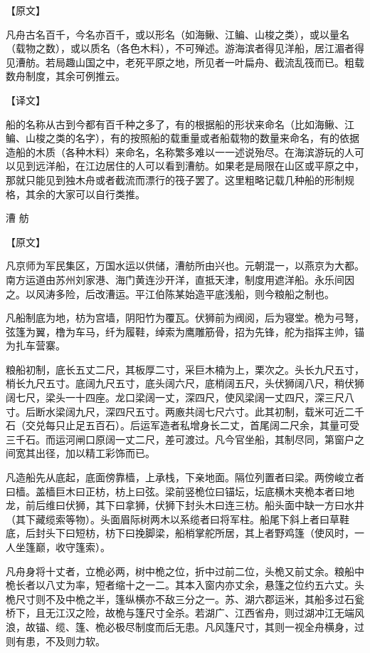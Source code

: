 \documentclass[12pt,UTF8]{ctexbook}
\begin{document}
【原文】

凡舟古名百千，今名亦百千，或以形名（如海鳅、江鳊、山梭之类），或以量名（载物之数），或以质名（各色木料），不可殚述。游海滨者得见洋船，居江湄者得见漕舫。若局趣山国之中，老死平原之地，所见者一叶扁舟、截流乱筏而已。粗载数舟制度，其余可例推云。

【译文】

船的名称从古到今都有百千种之多了，有的根据船的形状来命名（比如海鳅、江鳊、山梭之类的名字），有的按照船的载重量或者船载物的数量来命名，有的依据造船的木质（各种木料）来命名，名称繁多难以一一述说殆尽。在海滨游玩的人可以见到远洋船，在江边居住的人可以看到漕舫。如果老是局限在山区或平原之中，那就只能见到独木舟或者截流而漂行的筏子罢了。这里粗略记载几种船的形制规格，其余的大家可以自行类推。

漕 舫

【原文】

凡京师为军民集区，万国水运以供储，漕舫所由兴也。元朝混一，以燕京为大都。南方运道由苏州刘家港、海门黄连沙开洋，直抵天津，制度用遮洋船。永乐间因之。以风涛多险，后改漕运。平江伯陈某始造平底浅船，则今粮船之制也。

凡船制底为地，枋为宫墙，阴阳竹为覆瓦。伏狮前为阀阅，后为寝堂。桅为弓弩，弦篷为翼，橹为车马，纤为履鞋，绰索为鹰雕筋骨，招为先锋，舵为指挥主帅，锚为扎车营寨。

粮船初制，底长五丈二尺，其板厚二寸，采巨木楠为上，栗次之。头长九尺五寸，梢长九尺五寸。底阔九尺五寸，底头阔六尺，底梢阔五尺，头伏狮阔八尺，稍伏狮阔七尺，梁头一十四座。龙口梁阔一丈，深四尺，使风梁阔一丈四尺，深三尺八寸。后断水梁阔九尺，深四尺五寸。两廒共阔七尺六寸。此其初制，载米可近二千石（交兑每只止足五百石）。后运军造者私增身长二丈，首尾阔二尺余，其量可受三千石。而运河闸口原阔一丈二尺，差可渡过。凡今官坐船，其制尽同，第窗户之间宽其出径，加以精工彩饰而已。

凡造船先从底起，底面傍靠樯，上承栈，下亲地面。隔位列置者曰梁。两傍峻立者曰樯。盖樯巨木曰正枋，枋上曰弦。梁前竖桅位曰锚坛，坛底横木夹桅本者曰地龙，前后维曰伏狮，其下曰拿狮，伏狮下封头木曰连三枋。船头面中缺一方曰水井（其下藏缆索等物）。头面眉际树两木以系缆者曰将军柱。船尾下斜上者曰草鞋底，后封头下曰短枋，枋下曰挽脚梁，船梢掌舵所居，其上者野鸡篷（使风时，一人坐篷巅，收守篷索）。

凡舟身将十丈者，立桅必两，树中桅之位，折中过前二位，头桅又前丈余。粮船中桅长者以八丈为率，短者缩十之一二。其本入窗内亦丈余，悬篷之位约五六丈。头桅尺寸则不及中桅之半，篷纵横亦不敌三分之一。苏、湖六郡运米，其船多过石瓮桥下，且无江汉之险，故桅与篷尺寸全杀。若湖广、江西省舟，则过湖冲江无端风浪，故锚、缆、篷、桅必极尽制度而后无患。凡风篷尺寸，其则一视全舟横身，过则有患，不及则力软。
\end{document}
